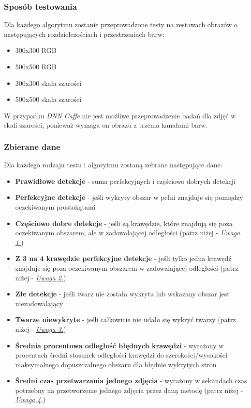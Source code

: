\subsubsection{Sposób testowania}

Dla każdego algorytmu zostanie przeprowadzone testy na zestawach obrazów o następujących rozdzielczościach i przestrzeniach barw:

\begin{itemize}
    \item 300x300 RGB
    \item 500x500 RGB
    \item 300x300 skala szarości
    \item 500x500 skala szarości
\end{itemize}

W przypadku \textit{DNN Caffe} nie jest możliwe przeprowadzenie badań dla zdjęć w skali szarości, ponieważ wymaga on obrazu z trzema kanałami barw.

\subsubsection{Zbierane dane}

Dla każdego rodzaju testu i algorytmu zostaną zebrane następujące dane:

\begin{itemize}
    \item \textbf{Prawidłowe detekcje} - suma perfekcyjnych i częściowo dobrych detekcji
    \item \textbf{Perfekcyjne detekcje} - jeśli wykryty obszar w pełni znajduje się pomiędzy oczekiwanym prostokątami
    \item \textbf{Częściowo dobre detekcje} - jeśli są krawędzie, które znajdują się poza oczekiwanym obszarem, ale w zadowalającej odległości (patrz niżej - \hyperref[{uwaga:czesciowo_dobry}]{\textit{Uwaga 1.}})
    \item \textbf{Z 3 na 4 krawędzie perfekcyjne detekcje} - jeśli tylko jedna krawędź znajduje się poza oczekiwanym obszarem w zadowalającej odległości (patrz niżej - \hyperref[{uwaga:3_4_perfekcyjny}]{\textit{Uwaga 2.}})
    \item \textbf{Złe detekcje} - jeśli twarz nie została wykryta lub wskazany obszar jest niezadowalający
    \item \textbf{Twarze niewykryte} - jeśli całkowicie nie udało się wykryć twarzy (patrz niżej - \hyperref[{uwaga:dodatkowy_zle}]{\textit{Uwaga 3.}})
    \item \textbf{Średnia procentowa odległość błędnych krawędzi} - wyrażony w procentach średni stosunek odległości krawędzi do szerokości/wysokości maksymalnego dopuszczalnego obszaru dla błędnie wykrytych stron
    \item \textbf{Średni czas przetwarzania jednego zdjęcia} - wyrażony w sekundach czas potrzebny na przetworzenie jednego zdjęcia przez daną  metodę (patrz niżej - \hyperref[{uwaga:ilosc_powtorzen}]{\textit{Uwaga 4.}})
\end{itemize}


